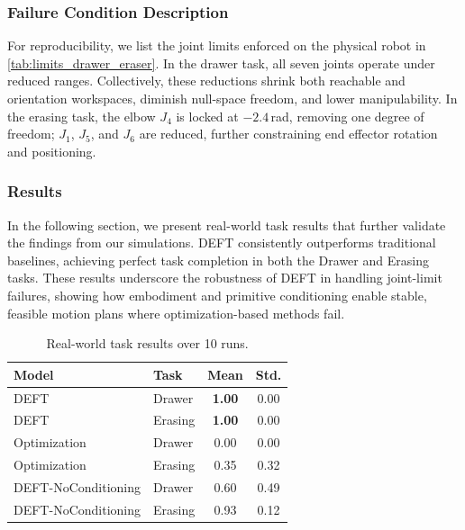 \subsubsection{Failure Condition Description}
For reproducibility, we list the joint limits enforced on the physical robot in \cref{tab:limits_drawer_eraser}. In the drawer task, all seven joints operate under reduced ranges. Collectively, these reductions shrink both reachable and orientation workspaces, diminish null-space freedom, and lower manipulability. In the erasing task, the elbow $J_4$ is locked at $-2.4$\,rad, removing one degree of freedom; $J_1$, $J_5$, and $J_6$ are reduced, further constraining end effector rotation and positioning.


\subsubsection{Results}
In the following section, we present real-world task results that further validate the findings from our simulations. \textsc{DEFT} consistently outperforms traditional baselines, achieving perfect task completion in both the Drawer and Erasing tasks. These results underscore the robustness of \textsc{DEFT} in handling joint-limit failures, showing how embodiment and primitive conditioning enable stable, feasible motion plans where optimization-based methods fail.
\vspace{-15pt}
\begin{table}[h]
\centering
\caption{Real-world task results over 10 runs. }
\label{tab:rw_tasks_combined}
\begingroup
\setlength{\tabcolsep}{5pt}
\renewcommand{\arraystretch}{1.1}
\footnotesize
\begin{tabular}{@{}llcc@{}}
\hline
\textbf{Model} & \textbf{Task} & \textbf{Mean} & \textbf{Std.}  \\
\hline
DEFT                & Drawer  & \textbf{1.00} & 0.00  \\
DEFT                & Erasing & \textbf{1.00} & 0.00 \\
Optimization        & Drawer  & 0.00 & 0.00 \\
Optimization        & Erasing & 0.35 & 0.32 \\
DEFT-NoConditioning & Drawer  & 0.60 & 0.49 \\
DEFT-NoConditioning & Erasing & 0.93 & 0.12 \\
\hline
\end{tabular}
\endgroup
\end{table}
\vspace{-11pt}
